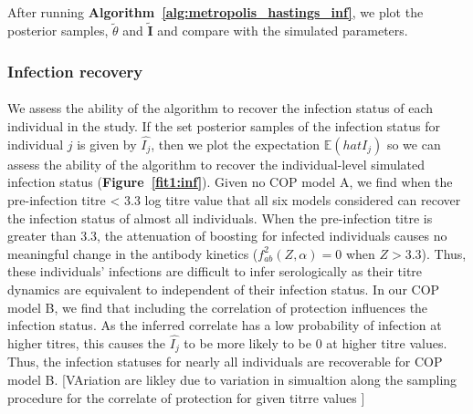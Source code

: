 \documentclass{article}
\begin{document}
\paragraph{} After running \textbf{Algorithm~\ref{alg:metropolis_hastings_inf}}, we plot the posterior samples, $\tilde{\theta}$ and $\tilde{\mathbf{I}}$ and compare with the simulated parameters.

\subsubsection{Infection recovery}

\paragraph{}We assess the ability of the algorithm to recover the infection status of each individual in the study. If the set posterior samples of the infection status for individual $j$ is given by $\hat{I_j} $, then we plot the expectation $\mathbb{E}(hat{I_j} )$ so we can assess the ability of the algorithm to recover the individual-level simulated infection status (\textbf{Figure~\ref{fit1:inf}}). Given no COP model A, we find when the pre-infection titre < 3.3 log titre value that all six models considered can recover the infection status of almost all individuals. When the pre-infection titre is greater than 3.3, the attenuation of boosting for infected individuals causes no meaningful change in the antibody kinetics ($f^2_{ab}(Z, \alpha) = 0$ when $Z > 3.3$). Thus, these individuals' infections are difficult to infer serologically as their titre dynamics are equivalent to independent of their infection status. In our COP model B, we find that including the correlation of protection influences the infection status. As the inferred correlate has a low probability of infection at higher titres, this causes the $\hat{I_j}$ to be more likely to be 0 at higher titre values. Thus, the infection statuses for nearly all individuals are recoverable for COP model B. [VAriation are likley due to variation in simualtion along the sampling procedure for the correlate of protection for given titrre values ]
\end{document}
